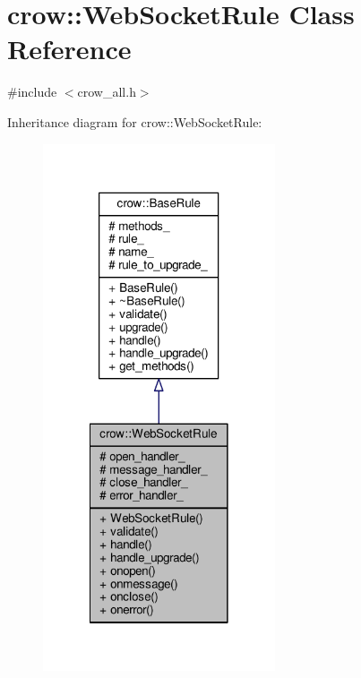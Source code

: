\hypertarget{classcrow_1_1_web_socket_rule}{\section{crow\-:\-:Web\-Socket\-Rule Class Reference}
\label{classcrow_1_1_web_socket_rule}
}


{\ttfamily \#include $<$crow\-\_\-all.\-h$>$}



Inheritance diagram for crow\-:\-:Web\-Socket\-Rule\-:
\nopagebreak
\begin{figure}[H]
\begin{center}
\leavevmode
\includegraphics[width=194pt]{classcrow_1_1_web_socket_rule__inherit__graph}
\end{center}
\end{figure}



